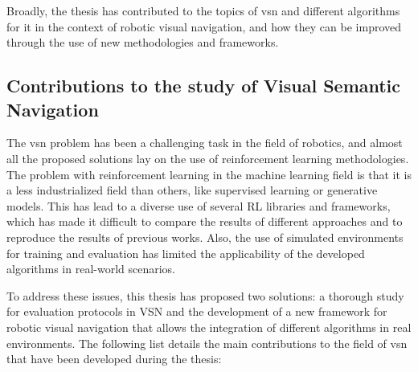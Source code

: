 Broadly, the thesis has contributed to the topics of \acrfull{vsn} and different algorithms for it in the context of robotic visual navigation, and how they can be improved through the use of new methodologies and frameworks.

\subsection{Contributions to the study of Visual Semantic Navigation}\label{subsec:contributions-to-visual-semantic-navigation}

The \acrshort{vsn} problem has been a challenging task in the field of robotics, and almost all the proposed solutions lay on the use of reinforcement learning methodologies.
The problem with reinforcement learning in the machine learning field is that it is a less industrialized field than others, like supervised learning or generative models.
This has lead to a diverse use of several \acrshort{RL} libraries and frameworks, which has made it difficult to compare the results of different approaches and to reproduce the results of previous works.
Also, the use of simulated environments for training and evaluation has limited the applicability of the developed algorithms in real-world scenarios.

To address these issues, this thesis has proposed two solutions: a thorough study for evaluation protocols in \acrshort{VSN} and the development of a new framework for robotic visual navigation that allows the integration of different algorithms in real environments.
The following list details the main contributions to the field of \acrshort{vsn} that have been developed during the thesis:

